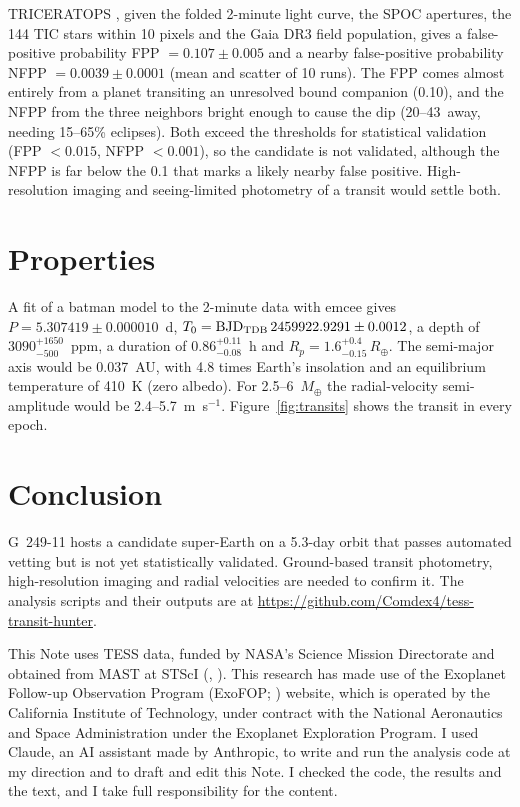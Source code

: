 \documentclass{aastex701}
\begin{document}
TRICERATOPS \citep{Giacalone2021}, given the folded 2-minute light curve, the SPOC
apertures, the 144 TIC stars within 10 pixels and the Gaia DR3 field population, gives a
false-positive probability FPP $=0.107\pm0.005$ and a nearby false-positive probability
NFPP $=0.0039\pm0.0001$ (mean and scatter of 10 runs). The FPP comes almost entirely from
a planet transiting an unresolved bound companion (0.10), and the NFPP from the three
neighbors bright enough to cause the dip (20--43\arcsec\ away, needing 15--65\% eclipses).
Both exceed the thresholds for statistical validation (FPP $<0.015$, NFPP $<0.001$), so
the candidate is not validated, although the NFPP is far below the 0.1 that marks a
likely nearby false positive. High-resolution imaging and seeing-limited photometry of a
transit would settle both.

\section{Properties}

A fit of a batman model \citep{Kreidberg2015} to the 2-minute data with emcee
\citep{ForemanMackey2013} gives $P=5.307419\pm0.000010$~d,
$T_0={\rm BJD_{TDB}}\,2459922.9291\pm0.0012$, a depth of $3090^{+1650}_{-500}$~ppm, a
duration of $0.86^{+0.11}_{-0.08}$~h and $R_p=1.6^{+0.4}_{-0.15}\,R_\oplus$. The
semi-major axis would be 0.037~AU, with 4.8 times Earth's insolation and an equilibrium
temperature of 410~K (zero albedo). For 2.5--6~$M_\oplus$ the radial-velocity
semi-amplitude would be 2.4--5.7~m~s$^{-1}$. Figure~\ref{fig:transits} shows the transit
in every epoch.

\section{Conclusion}

G~249-11 hosts a candidate super-Earth on a 5.3-day orbit that passes automated vetting
but is not yet statistically validated. Ground-based transit photometry,
high-resolution imaging and radial velocities are needed to confirm it. The analysis
scripts and their outputs are at \url{https://github.com/Comdex4/tess-transit-hunter}.

\begin{acknowledgments}
This Note uses TESS data, funded by NASA's Science Mission Directorate and obtained from
MAST at STScI
(,
).
This research has made use of the Exoplanet Follow-up Observation Program (ExoFOP;
) website, which is
operated by the California Institute of Technology, under contract with the National
Aeronautics and Space Administration under the Exoplanet Exploration Program.
I used Claude, an AI assistant made by Anthropic, to write and run the analysis code at
my direction and to draft and edit this Note. I checked the code, the results and the
text, and I take full responsibility for the content.
\end{acknowledgments}
\end{document}
